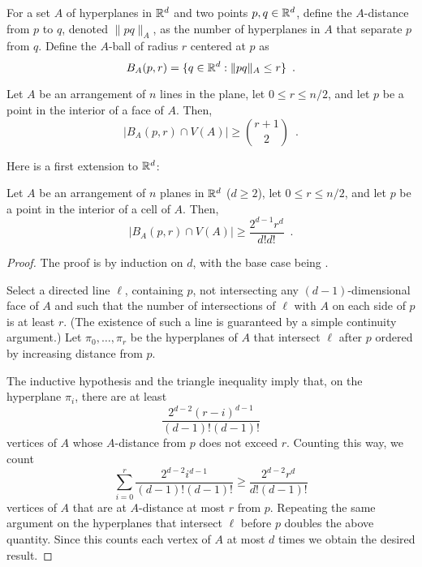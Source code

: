 \documentclass{article}
\begin{document}
For a set $A$ of hyperplanes in $\mathbb{R}^d$ and two points $p,q\in\mathbb{R}^d$,
define the $A$-distance from $p$ to $q$, denoted $\|pq\|_A$, as the
number of hyperplanes in $A$ that separate $p$ from $q$.  Define the
$A$-ball of radius $r$ centered at $p$ as
\[ 
   B_A(p,r) = \{q\in\mathbb{R}^d : \|pq\|_A \le r\} \enspace .
\]

\begin{lem}
Let $A$ be an arrangement of $n$ lines in the plane, let $0\le r\le
n/2$, and let $p$ be a point in the interior of a face of $A$.  Then,
\[
    |B_A(p,r) \cap V(A)| \ge {r+1 \choose 2} \enspace .
\]
\end{lem}

Here is a first extension to $\mathbb{R}^d$:
\begin{lem}
Let $A$ be an arrangement of $n$ planes in $\mathbb{R}^d$ ($d\ge 2$),  let
$0\le r\le n/2$, and let $p$ be a point in the interior of a cell of
$A$.  Then,
\[
    |B_A(p,r) \cap V(A)| \ge \frac{2^{d-1}r^d}{d!d!} \enspace .
\]
\end{lem}
\begin{proof}
The proof is by induction on $d$, with the base case being
.

Select a directed line $\ell$, containing $p$, not intersecting any
$(d-1)$-dimensional face of $A$ and such that the number of 
intersections of $\ell$ with
$A$ on each side of $p$ is at least $r$.  (The existence of such a
line is guaranteed by a simple continuity argument.)  Let
$\pi_0,\ldots,\pi_{r}$ be the hyperplanes of $A$ that intersect 
$\ell$ after $p$ ordered by increasing distance from $p$.

The inductive hypothesis and the triangle inequality imply that, on
the hyperplane
$\pi_i$, there are at least
\[
  \frac{2^{d-2}(r-i)^{d-1}}{(d-1)!(d-1)!} 
\]
vertices of $A$ whose $A$-distance from $p$ does not exceed $r$.
Counting this way, we count 
\[
  \sum_{i=0}^r \frac{2^{d-2}i^{d-1}}{(d-1)!(d-1)!} 
     \ge \frac{2^{d-2}r^{d}}{d!(d-1)!}
\]
vertices of $A$ that are at $A$-distance at most $r$ from $p$.
Repeating the same argument on the hyperplanes
that intersect $\ell$
before $p$ doubles the above quantity.  Since this counts each vertex
of $A$ at most $d$ times we obtain the desired result.
\end{proof}
\end{document}
